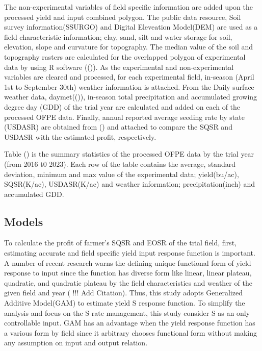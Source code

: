 \documentclass[
]{article}
\begin{document}
The non-experimental variables of field specific information are added
upon the processed yield and input combined polygon. The public data
resource, Soil survey information(SSURGO) and Digital Eleveation
Model(DEM) are used as a field characteristic information; clay, sand,
silt and water storage for soil, elevation, slope and curvature for
topography. The median value of the soil and topography rasters are
calculated for the overlapped polygon of experimental data by using R
software (()). As the experimental and
non-experimental variables are cleared and processed, for each
experimental field, in-season (April 1st to September 30th) weather
information is attached. From the Daily surface weather data,
daymet(()), in-season total
precipitation and accumulated growing degree day (GDD) of the trial year
are calculated and added on each of the processed OFPE data. Finally,
annual reported average seeding rate by state (USDASR) are obtained from
() and attached to compare the SQSR and USDASR
with the estimated profit, respectively.

Table () is
the summary statistics of the processed OFPE data by the trial year
(from 2016 t0 2023). Each row of the table contains the average,
standard deviation, minimum and max value of the experimental data;
yield(bu/ac), SQSR(K/ac), USDASR(K/ac) and weather information;
precipitation(inch) and accumulated GDD.

\subsection{Models}\label{models}

To calculate the profit of farmer's SQSR and EOSR of the trial field,
first, estimating accurate and field specific yield input response
function is important. A number of recent research warns the defining
unique functional form of yield response to input since the function has
diverse form like linear, linear plateau, quadratic, and quadratic
plateau by the field characteristics and weather of the given field and
year ( !!! Add Citation). Thus, this study adopts Generalized Additive
Model(GAM) to estimate yield S response function. To simplify the
analysis and focus on the S rate management, this study consider S as an
only controllable input. GAM has an advantage when the yield response
function has a various form by field since it arbitrary chooses
functional form without making any assumption on input and output
relation.
\end{document}
